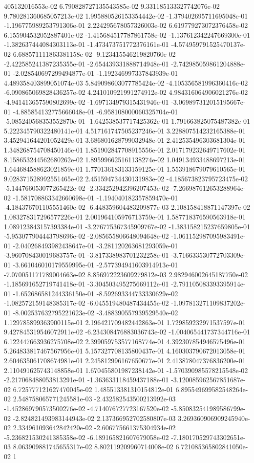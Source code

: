 405132016553e-02	6.790828727135543585e-02	9.331185133327742076e-02	9.780281360685057213e-02	1.995880526153354442e-02	-1.379402695711695048e-01	-1.196775989253791306e-01	2.224295678057326003e-02	6.619779273072376458e-02	6.155904532052887401e-02	-1.415684517787861758e-02	-1.137612342247669300e-01	-1.382637444084303113e-01	-1.473473751772376161e-01	-4.574959791525470137e-02	6.688571111863381158e-02	-9.123415546219820760e-02	-2.422585241387235355e-01	-2.654439331888714948e-01	-2.742985059861204888e-01	-2.028540697299494877e-01	-1.192346997337843939e-01	4.489358403899051074e-03	5.849098603077785424e-02	-4.105356581996360416e-02	-6.090865069828436257e-02	4.241010921991274912e-02	4.984316064906021276e-02	-4.941413657590802699e-02	-1.697134979315431946e-01	-3.069897312015195667e-01	-4.885854132775666048e-01	-6.958108000060325704e-01	-5.085240568353552870e-01	-1.642538537717425362e-01	1.791663825075487382e-01	5.222345790322480141e-01	4.517161747505237246e-01	3.228807514232165388e-01	3.452941644201052429e-01	3.686801628799032948e-01	2.412535496303681304e-01	1.348268754708450146e-01	1.851902847708915556e-01	2.017179232649717602e-01	8.158653244562680262e-02	1.895996625161138274e-02	1.049134933488697213e-01	1.644684588623021859e-01	1.770136183133159125e-01	1.553918679079610565e-01	9.028371528992551465e-02	2.451594734430131983e-02	-4.185673823795723475e-02	-5.144766053077265422e-02	-2.334252942396207453e-02	-7.266987612653288964e-02	-1.581708863342660698e-01	-1.194040182357859470e-01	-4.184376701105551460e-02	-6.448359604483209877e-03	2.108158418871147397e-02	1.083278317296577226e-01	2.001964105976713759e-01	1.587718376590563918e-01	1.089123843157393384e-01	-3.276775367345909767e-02	-1.383158215237659805e-01	-5.953077904443798696e-02	-2.085655806648094648e-02	-1.061152987095983491e-01	-2.040268493982438647e-01	-3.281120263681293059e-01	-3.960708430019683757e-01	-3.817338983701232258e-01	-3.716633530772703309e-01	-3.661046010179559995e-01	-2.577394941603914913e-01	-7.070051171789004663e-02	8.856972223609279812e-03	2.982946002645187750e-02	-1.185691652719741418e-01	-3.304503495275669112e-01	-2.791105083393395914e-01	-1.652686581244336150e-01	-8.592693344733330629e-02	-1.082572159148385317e-02	-6.045519480487434455e-02	-1.097813271109837202e-01	-8.002537632795221623e-02	-3.488390557939529540e-02	1.129785899363900115e-01	2.196421709482442863e-01	1.729859232971537597e-01	9.427845319546072911e-02	-6.234308476883036743e-02	-1.004065441737344716e-01	6.122447663936275708e-02	2.399059753577168774e-01	4.392307854946575496e-01	5.264833817467567956e-01	5.157327708135800437e-01	4.160303790672013058e-01	2.604635061708674981e-01	2.245812996167650677e-01	2.413878047376836200e-01	2.110491625743148858e-01	1.670455801987238142e-01	-1.570390985578215548e-02	-2.217068488053813291e-01	-1.363633118459437188e-01	-3.120085962567851687e-02	6.725777121627470045e-02	1.485513381310154812e-01	6.895549699582548264e-02	2.548758065771245581e-03	-2.432582543500213992e-03	-1.452869790573500276e-02	-4.714076727723167520e-02	-5.850832541989586799e-02	-2.824821493983144943e-02	2.137366952702580807e-03	3.269360906909245940e-02	2.334961093642842420e-02	-2.606775661375304934e-02	-5.236821530241385358e-02	-6.189165821607679058e-02	-7.180170529743302651e-03	8.063909881745655317e-02	8.802119209960714008e-02	6.721085365802841050e-02	1